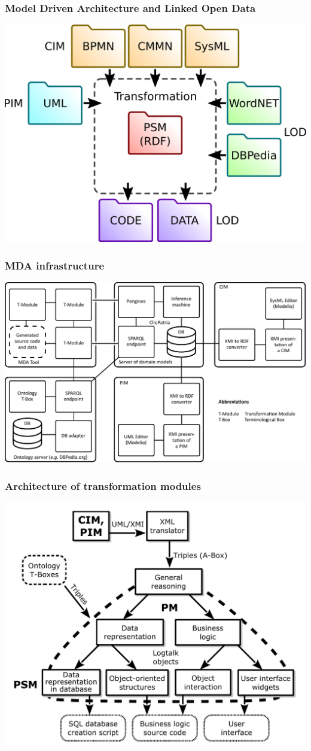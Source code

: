 \documentclass[10pt]{beamer}
\begin{document}
\begin{frame}
  \frametitle{Model Driven Architecture and Linked Open Data}
  \begin{center}
    \includegraphics[width=0.9\linewidth]{mda-overview.pdf}
  \end{center}
\end{frame}
\begin{frame}
  \frametitle{MDA infrastructure}
  \centering
  \includegraphics[width=1\linewidth]{architecture-mda-lod-ext.pdf}
\end{frame}
\begin{frame}
  \frametitle{Architecture of transformation modules}
  \centering
  \includegraphics[width=0.9\linewidth]{architect_tree_pres-en-wo-OCL.pdf}
\end{frame}
\end{document}
